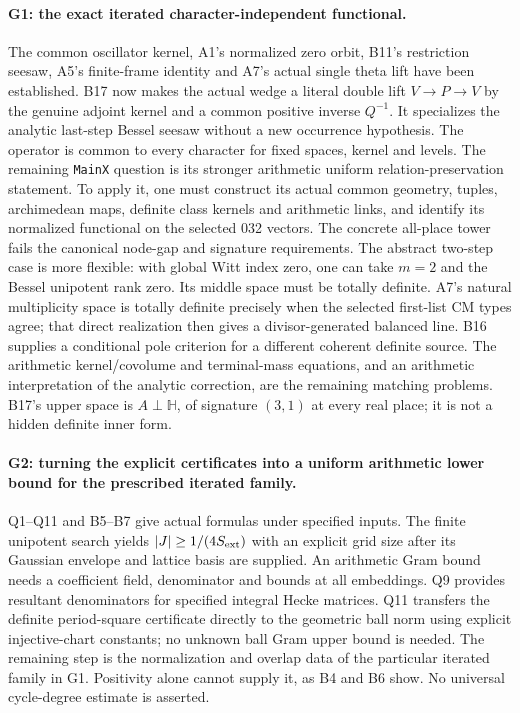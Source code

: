 \documentclass[11pt]{article}
\theoremstyle{definition}\newtheorem{definition}[theorem]{Definition}\newtheorem{remark}[theorem]{Remark}
\begin{document}
\paragraph{G1: the exact iterated character-independent functional.}
The common oscillator kernel, A1's normalized zero orbit, B11's
restriction seesaw, A5's finite-frame identity and A7's actual single
theta lift have been established. B17 now makes the actual wedge
a literal double lift $V\to P\to V$ by the genuine adjoint
kernel and a common positive inverse $Q^{-1}$.
It specializes the analytic last-step Bessel seesaw without a
new occurrence hypothesis. The operator is common to every
character for fixed spaces, kernel and levels.
The remaining \texttt{MainX} question is its stronger arithmetic
uniform relation-preservation statement. To apply it, one must
construct its actual common geometry,
tuples, archimedean maps, definite class kernels and arithmetic links,
and identify its normalized functional on the selected 032 vectors.
The concrete all-place tower fails the canonical node-gap and
signature requirements. The abstract two-step case is more flexible:
with global Witt index zero, one can take $m=2$ and the Bessel
unipotent rank zero. Its middle space must be totally definite.
A7's natural multiplicity space is totally definite precisely when
the selected first-list CM types agree; that direct realization then
gives a divisor-generated balanced line. B16 supplies a conditional
pole criterion for a different coherent definite source.
The arithmetic kernel/covolume and terminal-mass equations,
and an arithmetic interpretation of the analytic correction,
are the remaining matching problems. B17's upper space is
$A\perp\mathbb H$, of signature $(3,1)$ at every real place;
it is not a hidden definite inner form.

\paragraph{G2: turning the explicit certificates into a uniform
arithmetic lower bound for the prescribed iterated family.}
Q1--Q11 and B5--B7 give actual formulas under specified inputs.
The finite unipotent search yields $|J|\geq1/(4S_{\rm ext})$ with
an explicit grid size after its Gaussian envelope and lattice basis
are supplied. An arithmetic Gram bound needs a coefficient field,
denominator and bounds at all embeddings. Q9 provides resultant
denominators for specified integral Hecke matrices. Q11 transfers
the definite period-square certificate directly to the geometric
ball norm using explicit injective-chart constants; no unknown
ball Gram upper bound is needed. The remaining
step is the normalization and overlap data of the particular
iterated family in G1. Positivity alone cannot supply it, as B4
and B6 show. No universal cycle-degree estimate is asserted.
\end{document}
